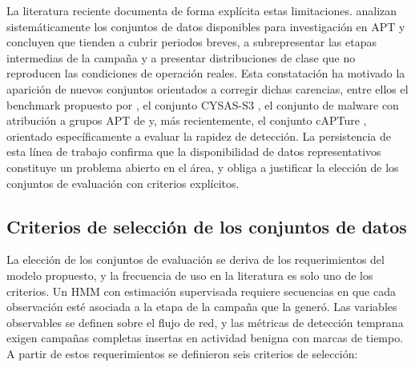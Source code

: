 La literatura reciente documenta de forma explícita estas limitaciones. \textcite{mamun_limitations_2024} analizan sistemáticamente los conjuntos de datos disponibles para investigación en APT y concluyen que tienden a cubrir periodos breves, a subrepresentar las etapas intermedias de la campaña y a presentar distribuciones de clase que no reproducen las condiciones de operación reales. Esta constatación ha motivado la aparición de nuevos conjuntos orientados a corregir dichas carencias, entre ellos el benchmark propuesto por \textcite{liu_new_2022}, el conjunto CYSAS-S3 \parencite{choumanof_introducing_2022}, el conjunto de malware con atribución a grupos APT de \textcite{erfan_mazaheri_aptracker_2024} y, más recientemente, el conjunto cAPTure \parencite{puccetti_capture_2026}, orientado específicamente a evaluar la rapidez de detección. La persistencia de esta línea de trabajo confirma que la disponibilidad de datos representativos constituye un problema abierto en el área, y obliga a justificar la elección de los conjuntos de evaluación con criterios explícitos.

\subsection{Criterios de selección de los conjuntos de datos}
\label{sec:criterios_datasets}
La elección de los conjuntos de evaluación se deriva de los requerimientos del modelo propuesto, y la frecuencia de uso en la literatura es solo uno de los criterios. Un HMM con estimación supervisada requiere secuencias en que cada observación esté asociada a la etapa de la campaña que la generó. Las variables observables se definen sobre el flujo de red, y las métricas de detección temprana exigen campañas completas insertas en actividad benigna con marcas de tiempo. A partir de estos requerimientos se definieron seis criterios de selección:

